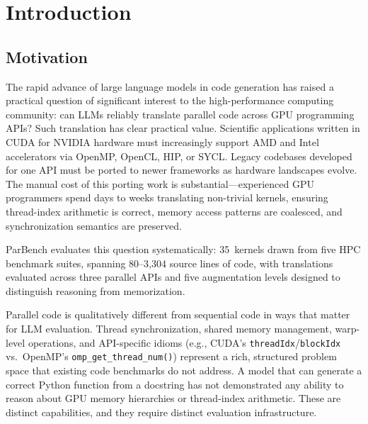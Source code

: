 \documentclass[conference]{IEEEtran}
\begin{document}
\section{Introduction}
\label{sec:introduction}

\subsection{Motivation}
\label{sec:motivation}

The rapid advance of large language models in code generation has raised a practical question of significant interest to the high-performance computing community: can LLMs reliably translate parallel code across GPU programming APIs? Such translation has clear practical value. Scientific applications written in CUDA for NVIDIA hardware must increasingly support AMD and Intel accelerators via OpenMP, OpenCL, HIP, or SYCL. Legacy codebases developed for one API must be ported to newer frameworks as hardware landscapes evolve. The manual cost of this porting work is substantial---experienced GPU programmers spend days to weeks translating non-trivial kernels, ensuring thread-index arithmetic is correct, memory access patterns are coalesced, and synchronization semantics are preserved.

ParBench evaluates this question systematically: 35~kernels drawn from five HPC benchmark suites, spanning 80--3{,}304 source lines of code, with translations evaluated across three parallel APIs and five augmentation levels designed to distinguish reasoning from memorization.

Parallel code is qualitatively different from sequential code in ways that matter for LLM evaluation. Thread synchronization, shared memory management, warp-level operations, and API-specific idioms (e.g., CUDA's \texttt{threadIdx}/\texttt{blockIdx} vs.\ OpenMP's \texttt{omp\_get\_thread\_num()}) represent a rich, structured problem space that existing code benchmarks do not address. A model that can generate a correct Python function from a docstring has not demonstrated any ability to reason about GPU memory hierarchies or thread-index arithmetic. These are distinct capabilities, and they require distinct evaluation infrastructure.
\end{document}
